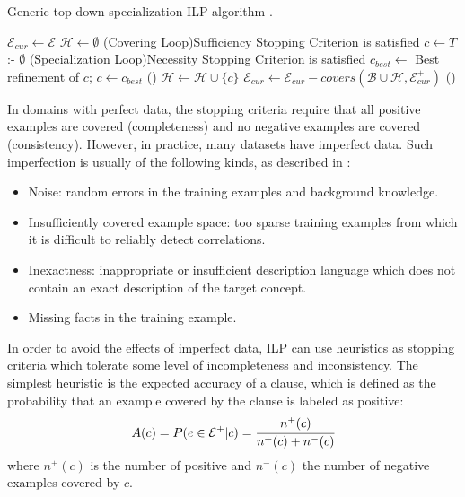 \begin{algorithm}[!h]
  \caption{Generic top-down specialization ILP algorithm \citep{DBLP:journals/ml/LavracD96}.}

  $\mathcal{E}_{cur} \leftarrow \mathcal{E}$ \;
  $\mathcal{H} \leftarrow \emptyset$ \;
  \Repeat(Covering Loop){Sufficiency Stopping Criterion is satisfied} {
    $c \leftarrow T$ :- $\emptyset$ \;
    \Repeat(Specialization Loop){Necessity Stopping Criterion is satisfied} {
      $c_{best} \leftarrow$ Best refinement of $c$;
      $c \leftarrow c_{best}$ \;
    } ()
    $\mathcal{H} \leftarrow \mathcal{H} \cup \{c\}$ \;
    $\mathcal{E}_{cur} \leftarrow \mathcal{E}_{cur} - covers(\mathcal{B} \cup \mathcal{H},\mathcal{E}_{cur}^{+})$ \;
  } ()
 \label{alg:topDownILP}
\end{algorithm}

In domains with perfect data, the stopping criteria require that all positive examples are covered (completeness) and
no
negative examples are covered (consistency). However, in practice, many datasets have imperfect data. Such
imperfection is usually of the following kinds, as described in \citet{DBLP:conf/aii/LavracD92}:

\begin{itemize}
  \item Noise: random errors in the training examples and background knowledge.
  \item Insufficiently covered example space: too sparse training examples from which it is difficult to reliably
detect correlations.
  \item Inexactness: inappropriate or insufficient description language which does not contain an exact description of
the target concept.
  \item Missing facts in the training example.
\end{itemize}

In order to avoid the effects of imperfect data, ILP can use heuristics as stopping criteria which tolerate
some level of incompleteness and inconsistency. The simplest heuristic is the expected accuracy of a clause, which is
defined as the probability that an example
covered by the clause is labeled as positive:
\begin{equation}
A(c)=P(e \in \mathcal{E}^{+}|c)=\cfrac{n^{+}(c)}{n^{+}(c)+n^{-}(c)} 
\end{equation}
where $n^{+}(c)$ is the number of positive and $n^{-}(c)$ the number of negative examples covered by $c$. 

